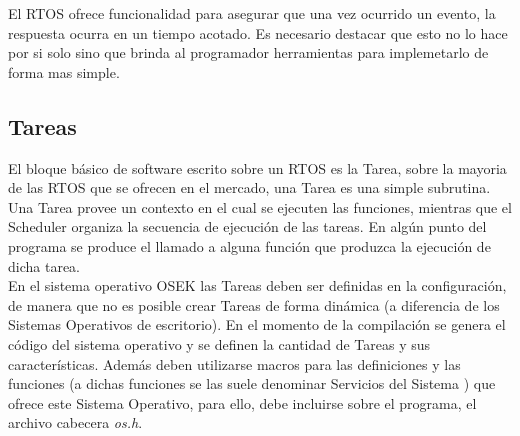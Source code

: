 \documentclass[12pt,letterpaper]{article}
\begin{document}
El RTOS ofrece funcionalidad para asegurar que una vez ocurrido un evento, la respuesta ocurra en un tiempo acotado. Es necesario destacar que esto no lo hace por si solo sino que brinda al programador herramientas para implemetarlo de forma mas simple.

\subsection{Tareas}\label{sec:tareas}
El bloque básico de software escrito sobre un RTOS es la Tarea, sobre la mayoria de las RTOS que se ofrecen en el mercado, una Tarea es una simple subrutina.
 \\
 
Una Tarea provee un contexto en el cual se ejecuten las funciones, mientras que el Scheduler organiza la secuencia de ejecución de las tareas.
En algún punto del programa se produce el llamado a alguna función que produzca la ejecución de dicha tarea.
 \\
 
En el sistema operativo OSEK las Tareas deben ser definidas en la configuración, de manera que no es posible crear Tareas de forma dinámica (a diferencia de los Sistemas Operativos de escritorio). En el momento de la compilación se genera el código del sistema operativo y se definen la cantidad de Tareas y sus características. Además deben utilizarse macros para las definiciones y las funciones (a dichas funciones se las suele denominar Servicios del Sistema ) que ofrece este Sistema Operativo, para ello, debe incluirse sobre el programa, el archivo cabecera \textit{os.h}.
 \\
 
\end{document}
